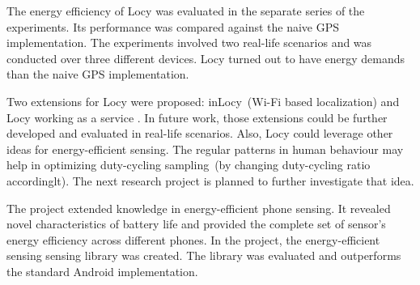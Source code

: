 The energy efficiency of Locy was evaluated in the separate series of the experiments. Its performance was compared against the naive GPS implementation. The experiments involved two real-life scenarios and was conducted over three different devices. Locy turned out to have energy demands than the naive GPS implementation. 

Two extensions for Locy were proposed: inLocy\ (Wi-Fi based localization) and Locy working as a service . In future work, those extensions could be further developed and evaluated in real-life scenarios. Also, Locy could leverage other ideas for energy-efficient sensing. The regular patterns in human behaviour may help in optimizing duty-cycling sampling\ (by changing duty-cycling ratio accordinglt). The next research project is planned to further investigate that idea.
		
The project extended knowledge in energy-efficient phone sensing. It revealed novel characteristics of battery life and provided the complete set of sensor's energy efficiency across different phones. In the project, the energy-efficient sensing sensing library was created. The library was evaluated and outperforms the standard Android implementation. 
	
